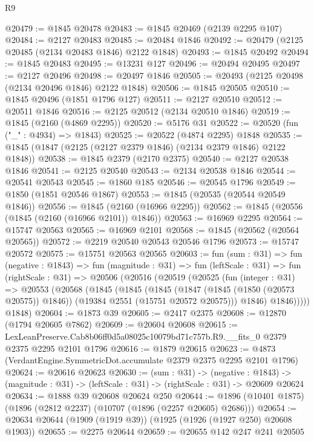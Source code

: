 \begin{lexlean}{R9}
\begin{coremodule}
@20479 := @1845 @20478
@20483 := @1845 @20469 (@2139 @2295 @107)
@20484 := @2127 @20483
@20485 := @20484 @1846
@20492 := @20479 (@2125 @20485 (@2134 @20483 @1846) @2122 @1848)
@20493 := @1845 @20492
@20494 := @1845 @20483
@20495 := @13231 @127
@20496 := @20494 @20495
@20497 := @2127 @20496
@20498 := @20497 @1846
@20505 := @20493 (@2125 @20498 (@2134 @20496 @1846) @2122 @1848)
@20506 := @1845 @20505
@20510 := @1845 @20496 (@1851 @1796 @127)
@20511 := @2127 @20510
@20512 := @20511 @1846
@20516 := @2125 @20512 (@2134 @20510 @1846)
@20519 := @1845 (@2160 (@4869 @2295))
@20520 := @5176 @31
@20522 := @20520 (fun ("_" : @4934) => @1843)
@20525 := @20522 (@4874 @2295) @1848
@20535 := @1845 (@1847 (@2125 (@2127 @2379 @1846) (@2134 @2379 @1846) @2122 @1848))
@20538 := @1845 @2379 (@2170 @2375)
@20540 := @2127 @20538 @1846
@20541 := @2125 @20540
@20543 := @2134 @20538 @1846
@20544 := @20541 @20543
@20545 := @1860 @185
@20546 := @20545 @1796
@20549 := @1850 (@1851 @20546 @1867)
@20553 := @1845 (@20535 (@20544 @20549 @1846))
@20556 := @1845 (@2160 (@16966 @2295))
@20562 := @1845 (@20556 (@1845 (@2160 (@16966 @2101)) @1846))
@20563 := @16969 @2295
@20564 := @15747 @20563
@20565 := @16969 @2101
@20568 := @1845 (@20562 (@20564 @20565))
@20572 := @2219 @20540 @20543 @20546 @1796
@20573 := @15747 @20572
@20575 := @15751 @20563 @20565
@20603 := fun (sum : @31) =>
  fun (negative : @1843) =>
  fun (magnitude : @31) =>
  fun (leftScale : @31) =>
  fun (rightScale : @31) =>
  @20506
    (@20516
      (@20519
        (@20525
          (fun (integer : @31) =>
          @20553
            (@20568
              (@1845
                (@1845
                  (@1845
                    (@1847 (@1845 (@1850 (@20573 @20575)) @1846))
                    (@19384 @2551 (@15751 @20572 @20575)))
                  @1846)
                @1846)))))
      @1848)
@20604 := @1873 @39
@20605 := @2417 @2375
@20608 := @12870 (@1794 @20605 @7862)
@20609 := @20604 @20608
@20615 := LexLeanPreserve.Cab8b06ff0d5a08025c10079bd71c757b.R9.__fits_0
    @2379
    @2375
    @2295
    @2101
    @1796
@20616 := @1879 @20615
@20623 := @4873 (VerdantEngine.SymmetricDot.accumulate @2379 @2375 @2295 @2101 @1796)
@20624 := @20616 @20623
@20630 := (sum : @31) ->
  (negative : @1843) ->
  (magnitude : @31) -> (leftScale : @31) -> (rightScale : @31) -> @20609 @20624
@20634 := @1888 @39 @20608 @20624 @250
@20644 := @1896 (@10401 @1875) (@1896 (@2812 @2237) (@10707 (@1896 (@2257 @20605) @2686)))
@20654 := @20634 @20644 (@1909 (@1919 @39)) (@1925 (@1926 (@1927 @250) @20608 @1903))
@20655 := @2275 @20644
@20659 := @20655 @142 @247 @241 @20505

\end{coremodule}
\end{lexlean}
